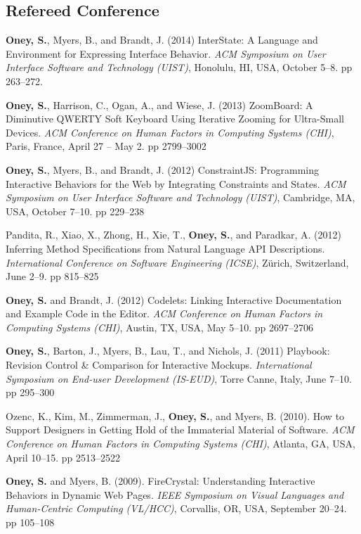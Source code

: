 \subsection{Refereed Conference}

 {
    \textbf{Oney, S.}, Myers, B., and Brandt, J. (2014) InterState: A Language and Environment for Expressing Interface Behavior. \textit{ACM Symposium on User Interface Software and Technology (UIST)}, Honolulu, HI, USA, October 5--8.  pp 263--272.
}

 {
\textbf{Oney, S.}, Harrison, C., Ogan, A., and Wiese, J. (2013) ZoomBoard: A Diminutive QWERTY Soft Keyboard Using Iterative Zooming for Ultra-Small Devices. \textit{ACM Conference on Human Factors in Computing Systems (CHI)}, Paris, France, April 27 -- May 2. pp 2799--3002
}

 {
\textbf{Oney, S.}, Myers, B., and Brandt, J. (2012) ConstraintJS: Programming Interactive Behaviors for the Web by Integrating Constraints and States. \textit{ACM Symposium on User Interface Software and Technology (UIST)}, Cambridge, MA, USA, October 7--10. pp 229--238
}

 {
Pandita, R., Xiao, X., Zhong, H., Xie, T., \textbf{Oney, S.}, and Paradkar, A. (2012) Inferring Method Specifications from Natural Language API Descriptions. \textit{International Conference on Software Engineering (ICSE)}, Zürich, Switzerland, June 2--9. pp 815--825
}

 {
\textbf{Oney, S.} and Brandt, J. (2012) Codelets: Linking Interactive Documentation and Example Code in the Editor. \textit{ACM Conference on Human Factors in Computing Systems (CHI)}, Austin, TX, USA, May 5--10. pp 2697--2706
}

 {
\textbf{Oney, S.}, Barton, J., Myers, B., Lau, T., and Nichols, J. (2011) Playbook: Revision Control \& Comparison for Interactive Mockups. \textit{International Symposium on End-user Development (IS-EUD)}, Torre Canne, Italy, June 7--10. pp 295--300
}

 {
Ozenc, K., Kim, M., Zimmerman, J., \textbf{Oney, S.}, and Myers, B. (2010). How to Support Designers in Getting Hold of the Immaterial Material of Software. \textit{ACM Conference on Human Factors in Computing Systems (CHI)}, Atlanta, GA, USA, April 10--15. pp 2513--2522
}

 {
\textbf{Oney, S.} and Myers, B. (2009). FireCrystal: Understanding Interactive Behaviors in Dynamic Web Pages. \textit{IEEE Symposium on Visual Languages and Human-Centric Computing (VL/HCC)}, Corvallis, OR, USA, September 20--24. pp 105--108
}

